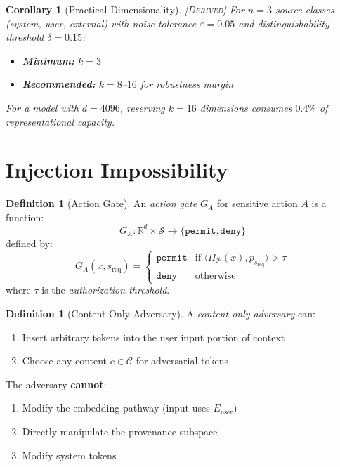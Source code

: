 \documentclass[11pt,a4paper]{article}
\theoremstyle{plain}
\newtheorem{corollary}[theorem]{Corollary}
\theoremstyle{definition}
\newtheorem{definition}[theorem]{Definition}
\theoremstyle{remark}
\newcommand{\R}{\mathbb{R}}
\newcommand{\Cspace}{\mathcal{C}}
\newcommand{\Pspace}{\mathcal{P}}
\newcommand{\Sclass}{\mathcal{S}}
\newcommand{\ip}[2]{\langle #1, #2 \rangle}
\newcommand{\proj}[1]{\Pi_{#1}}
\newcommand{\derived}{\textsc{[Derived]}}
\begin{document}
\begin{corollary}[Practical Dimensionality] \label{cor:practical} \derived
For $n = 3$ source classes (system, user, external) with noise tolerance $\varepsilon = 0.05$ and distinguishability threshold $\delta = 0.15$:
\begin{itemize}
    \item \textbf{Minimum:} $k = 3$
    \item \textbf{Recommended:} $k = 8$--$16$ for robustness margin
\end{itemize}

For a model with $d = 4096$, reserving $k = 16$ dimensions consumes $0.4\%$ of representational capacity.
\end{corollary}

\section{Injection Impossibility}

\begin{definition}[Action Gate] \label{def:gate}
An \emph{action gate} $G_A$ for sensitive action $A$ is a function:
\begin{equation}
G_A: \R^d \times \Sclass \to \{\texttt{permit}, \texttt{deny}\}
\end{equation}
defined by:
\begin{equation}
G_A(x, s_{\text{req}}) = \begin{cases}
\texttt{permit} & \text{if } \ip{\proj{\Pspace}(x)}{p_{s_{\text{req}}}} > \tau \\
\texttt{deny} & \text{otherwise}
\end{cases}
\end{equation}
where $\tau$ is the \emph{authorization threshold}.
\end{definition}

\begin{definition}[Content-Only Adversary] \label{def:adversary}
A \emph{content-only adversary} can:
\begin{enumerate}
    \item Insert arbitrary tokens into the user input portion of context
    \item Choose any content $c \in \Cspace$ for adversarial tokens
\end{enumerate}

The adversary \textbf{cannot}:
\begin{enumerate}
    \item Modify the embedding pathway (input uses $E_{\text{user}}$)
    \item Directly manipulate the provenance subspace
    \item Modify system tokens
\end{enumerate}
\end{definition}
\end{document}
